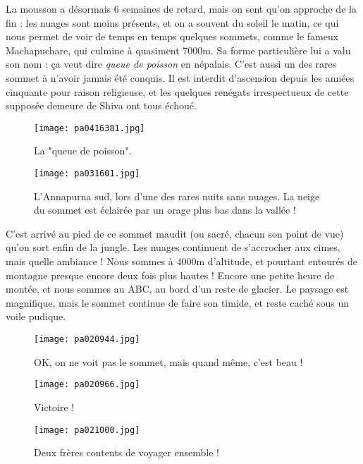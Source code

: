 \documentclass{book}
\begin{document}
La mousson a désormais 6 semaines de retard, mais on sent qu'on approche de la fin : les nuages sont moins présents, et on a souvent du soleil le matin, ce qui nous permet de voir de temps en temps quelques sommets, comme le fameux Machapuchare, qui culmine à quasiment 7000m. Sa forme particulière lui a valu son nom : ça veut dire \emph{queue de poisson} en népalais. C'est aussi un des rares sommet à n'avoir jamais été conquis. Il est interdit d'ascension depuis les années cinquante pour raison religieuse, et les quelques renégats irrespectueux de cette supposée demeure de Shiva ont tous échoué.


\begin{figure}[h]
\centering
\texttt{[image: pa0416381.jpg]}
\caption*{La "queue de poisson".}
\end{figure}


\begin{figure}[h]
\centering
\texttt{[image: pa031601.jpg]}
\caption*{L'Annapurna sud, lors d'une des rares nuits sans nuages. La neige du sommet est éclairée par un orage plus bas dans la vallée !}
\end{figure}

C'est arrivé au pied de ce sommet maudit (ou sacré, chacun son point de vue) qu'on sort enfin de la jungle. Les nuages continuent de s'accrocher aux cimes, mais quelle ambiance ! Nous sommes à 4000m d'altitude, et pourtant entourés de montagne presque encore deux fois plus hautes ! Encore une petite heure de montée, et nous sommes au ABC, au bord d'un reste de glacier. Le paysage est magnifique, mais le sommet continue de faire son timide, et reste caché sous un voile pudique.


\begin{figure}[h]
\centering
\texttt{[image: pa020944.jpg]}
\caption*{OK, on ne voit pas le sommet, mais quand même, c'est beau !}
\end{figure}


\begin{figure}[h]
\centering
\texttt{[image: pa020966.jpg]}
\caption*{Victoire !}
\end{figure}


\begin{figure}[h]
\centering
\texttt{[image: pa021000.jpg]}
\caption*{Deux frères contents de voyager ensemble !}
\end{figure}
\end{document}
